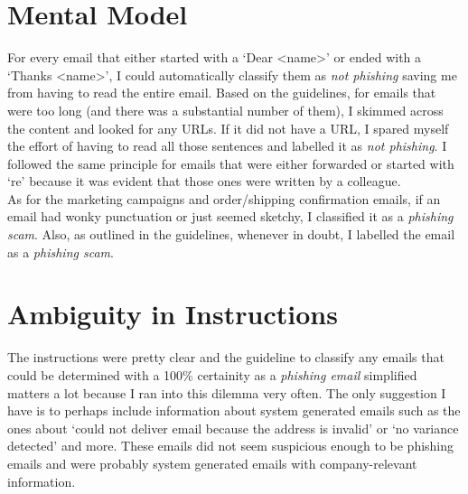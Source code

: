\documentclass[titlepage]{article}
\begin{document}
\section{Mental Model}
For every email that either started with a `Dear <name>' or ended with a `Thanks <name>', I could 
automatically classify them as \emph{not phishing} saving me from having to read the entire email. 
Based on the guidelines, for emails that were too long (and there was a substantial number of them), I 
skimmed across the content and looked for any URLs. If it did not have a URL, I spared myself the effort 
of having to read all those sentences and labelled it as \emph{not phishing}. I followed the same 
principle for emails that were either forwarded or started with `re' because it was evident that those 
ones were written by a colleague.\\
\newline
As for the marketing campaigns and order/shipping confirmation emails, if an email had wonky punctuation 
or just seemed sketchy, I classified it as a \emph{phishing scam}. Also, as outlined in the guidelines, 
whenever in doubt, I labelled the email as a \emph{phishing scam}.

\section{Ambiguity in Instructions}
The instructions were pretty clear and the guideline to classify any emails that could be determined with a 
100\% certainity as a \emph{phishing email} simplified matters a lot because I ran into this dilemma very often.
The only suggestion I have is to perhaps include information about system generated emails such as the ones about 
`could not deliver email because the address is invalid' or `no variance detected' and more. These emails did not 
seem suspicious enough to be phishing emails and were probably system generated emails with company-relevant information.
\end{document}
